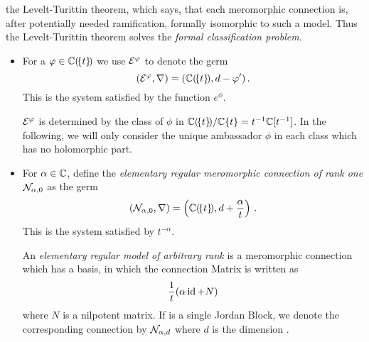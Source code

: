  the Levelt-Turittin theorem, which says,
that each meromorphic connection is, after potentially needed ramification,
formally isomorphic to such a model.
Thus the Levelt-Turittin theorem solves the \emph{formal classification
problem}.
\begin{defn}\label{defn:elemnMerConnBausteine}
  \begin{itemize}
    \item For a $\varphi\in\mathbb{C}(\!\{t\}\!)$ we use $\mathcal{E}^{\varphi}$ to denote the germ
      \[
        (\mathcal{E}^{\varphi},\nabla)=(\mathbb{C}(\!\{t\}\!),d-\varphi')\,.
      \]
      This is the system satisfied by the function $e^\phi$.
      \begin{s-cor}
        $\mathcal{E}^\varphi$ is determined by the class of $\phi$ in
        $\mathbb{C}(\!\{t\}\!)/\mathbb{C}\{t\}=t^{-1}\mathbb{C}[t^{-1}]$. In the following, we will
        only consider the unique ambassador $\phi$ in each class which has no
        holomorphic part.
      \end{s-cor}
    \item For $\alpha\in\mathbb{C}$, define the \emph{elementary regular meromorphic
      connection of rank one} $\mathcal{N}_{\alpha,0}$ as the germ
      \[
        (\mathcal{N}_{\alpha,0},\nabla)=\left(\mathbb{C}(\!\{t\}\!),d+\frac{\alpha}{t}\right)
        \,.
      \]
      This is the system satisfied by $t^{-\alpha}$.

      An \emph{elementary regular model of arbitrary rank} is a meromorphic
      connection which has a basis, in which the connection Matrix is written
      as
      \[
        \frac{1}{t} (\alpha\operatorname{id}+N)
      \]
      where $N$ is a nilpotent matrix.
      If  is a single Jordan Block, we denote the
      corresponding connection by $\mathcal{N}_{\alpha,d}$ where $d$ is the dimension
      .
  \end{itemize}
\end{defn}
